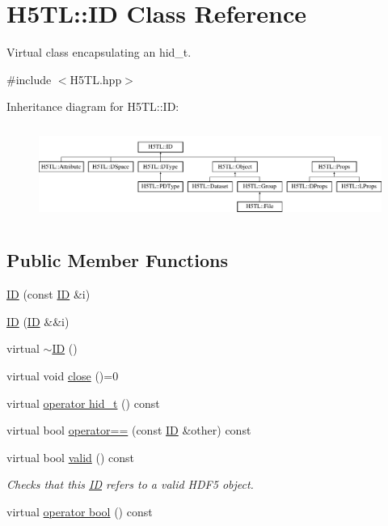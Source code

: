 \hypertarget{class_h5_t_l_1_1_i_d}{\section{H5\-T\-L\-:\-:I\-D Class Reference}
\label{class_h5_t_l_1_1_i_d}
}


Virtual class encapsulating an hid\-\_\-t.  




{\ttfamily \#include $<$H5\-T\-L.\-hpp$>$}

Inheritance diagram for H5\-T\-L\-:\-:I\-D\-:\begin{figure}[H]
\begin{center}
\leavevmode
\includegraphics[height=3.106796cm]{class_h5_t_l_1_1_i_d}
\end{center}
\end{figure}
\subsection*{Public Member Functions}
\begin{DoxyCompactItemize}
\item 
\hyperlink{class_h5_t_l_1_1_i_d_a408f510fcc998acb721e21c483846caa}{I\-D} (const \hyperlink{class_h5_t_l_1_1_i_d}{I\-D} \&i)
\item 
\hyperlink{class_h5_t_l_1_1_i_d_ac3f6aeae98925e043f2e2e3c892d42fd}{I\-D} (\hyperlink{class_h5_t_l_1_1_i_d}{I\-D} \&\&i)
\item 
virtual \hyperlink{class_h5_t_l_1_1_i_d_ac262957473b62ff680747b1244be8ff0}{$\sim$\-I\-D} ()
\item 
virtual void \hyperlink{class_h5_t_l_1_1_i_d_ad1a35bb991077bb094cdb0bb44339907}{close} ()=0
\item 
virtual \hyperlink{class_h5_t_l_1_1_i_d_a62a65c2333d41830c1410a6487dee22d}{operator hid\-\_\-t} () const 
\item 
virtual bool \hyperlink{class_h5_t_l_1_1_i_d_ace3dd29ee46843c37e8622369698baf2}{operator==} (const \hyperlink{class_h5_t_l_1_1_i_d}{I\-D} \&other) const 
\item 
virtual bool \hyperlink{class_h5_t_l_1_1_i_d_a84bdd4ffb1463004dfaef450b4e19d37}{valid} () const 
\begin{DoxyCompactList}\small\item\em Checks that this \hyperlink{class_h5_t_l_1_1_i_d}{I\-D} refers to a valid H\-D\-F5 object. \end{DoxyCompactList}\item 
virtual \hyperlink{class_h5_t_l_1_1_i_d_a71ff0b5de76ffecc1292c8b6ef8292f1}{operator bool} () const 
\end{DoxyCompactItemize}
